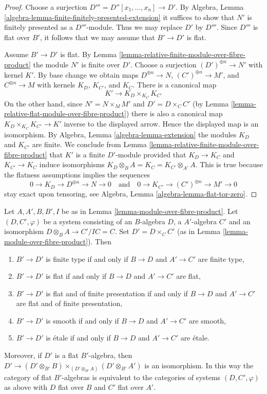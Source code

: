 \begin{proof}
Choose a surjection $D''' = D''[x_1, \ldots, x_n] \to D'$.
By Algebra, Lemma \ref{algebra-lemma-finite-finitely-presented-extension}
it suffices to show that $N'$ is finitely presented as a
$D'''$-module. Thus we may replace $D'$ by $D'''$. Since $D'''$ is
flat over $B'$, it follows that we may assume that $B' \to D'$ is flat.

\medskip\noindent
Assume $B' \to D'$ is flat.
By Lemma \ref{lemma-relative-finite-module-over-fibre-product}
the module $N'$ is finite over $D'$. Choose a surjection
$(D')^{\oplus n} \to N'$ with kernel $K'$. By base change we obtain maps
$D^{\oplus n} \to N$, $(C')^{\oplus n} \to M'$, and $C^{\oplus n} \to M$
with kernels $K_D$, $K_{C'}$, and $K_C$. There is a canonical map
$$
K' \longrightarrow K_D \times_{K_C} K_{C'}
$$
On the other hand, since $N' = N \times_M M'$ and
$D' = D \times_C C'$ (by
Lemma \ref{lemma-relative-flat-module-over-fibre-product})
there is also a
canonical map $K_D \times_{K_C} K_{C'} \to K'$ inverse to the displayed
arrow. Hence the displayed map is an isomorphism. By
Algebra, Lemma \ref{algebra-lemma-extension}
the modules $K_D$ and $K_{C'}$ are finite. We conclude from
Lemma \ref{lemma-relative-finite-module-over-fibre-product}
that $K'$ is a finite $D'$-module provided that $K_D \to K_C$ and
$K_{C'} \to K_C$ induce isomorphisms
$K_D \otimes_B A = K_C = K_{C'} \otimes_{A'} A$.
This is true because the flatness assumptions implies the sequences
$$
0 \to K_D \to D^{\oplus n} \to N \to 0
\quad\text{and}\quad
0 \to K_{C'} \to (C')^{\oplus n} \to M' \to 0
$$
stay exact upon tensoring, see
Algebra, Lemma \ref{algebra-lemma-flat-tor-zero}.
\end{proof}

\begin{lemma}
\label{lemma-properties-algebras-over-fibre-product}
Let $A, A', B, B', I$ be as in
Lemma \ref{lemma-module-over-fibre-product}.
Let $(D, C', \varphi)$ be a system consisting of an $B$-algebra $D$,
a $A'$-algebra $C'$ and an isomorphism $D \otimes_B A \to C'/IC = C$.
Set $D' = D \times_C C'$ (as in
Lemma \ref{lemma-module-over-fibre-product}). Then
\begin{enumerate}
\item $B' \to D'$ is finite type if and only if $B \to D$ and
$A' \to C'$ are finite type,
\item $B' \to D'$ is flat if and only if $B \to D$ and $A' \to C'$ are flat,
\item $B' \to D'$ is flat and of finite presentation if and only if
$B \to D$ and $A' \to C'$ are flat and of finite presentation,
\item $B' \to D'$ is smooth if and only if $B \to D$ and $A' \to C'$ are smooth,
\item $B' \to D'$ is \'etale if and only if $B \to D$ and $A' \to C'$
are \'etale.
\end{enumerate}
Moreover, if $D'$ is a flat $B'$-algebra, then
$D' \to (D' \otimes_{B'} B) \times_{(D' \otimes_{B'} A)} (D' \otimes_{B'} A')$
is an isomorphism. In this way the category of flat $B'$-algebras
is equivalent to the categories of systems $(D, C', \varphi)$ as above
with $D$ flat over $B$ and $C'$ flat over $A'$.
\end{lemma}

